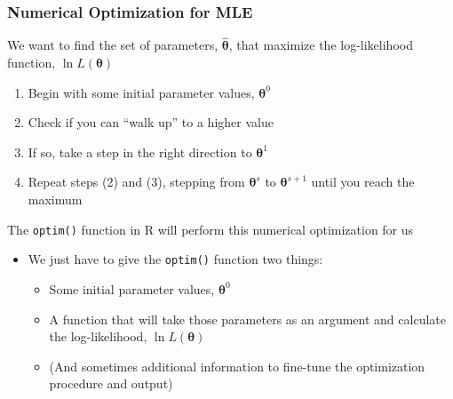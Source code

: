 \documentclass{beamer}
\begin{document}
\begin{frame}\frametitle{Numerical Optimization for MLE}
    We want to find the set of parameters, $\widehat{\bm{\theta}}$, that maximize the log-likelihood function, $\ln L(\bm{\theta})$
    \begin{enumerate}
        \item Begin with some initial parameter values, $\bm{\theta}^0$
        \item Check if you can ``walk up'' to a higher value
        \item If so, take a step in the right direction to $\bm{\theta}^1$
        \item Repeat steps (2) and (3), stepping from $\bm{\theta}^s$ to $\bm{\theta}^{s + 1}$ until you reach the maximum
    \end{enumerate}
    \vspace{3ex}
    The \texttt{optim()} function in R will perform this numerical optimization for us
    \begin{itemize}
        \item We just have to give the \texttt{optim()} function two things:
        \begin{itemize}
            \item Some initial parameter values, $\bm{\theta}^0$
            \item A function that will take those parameters as an argument and calculate the log-likelihood, $\ln L(\bm{\theta})$
            \item (And sometimes additional information to fine-tune the optimization procedure and output)
        \end{itemize}
    \end{itemize}
\end{frame}
\end{document}
